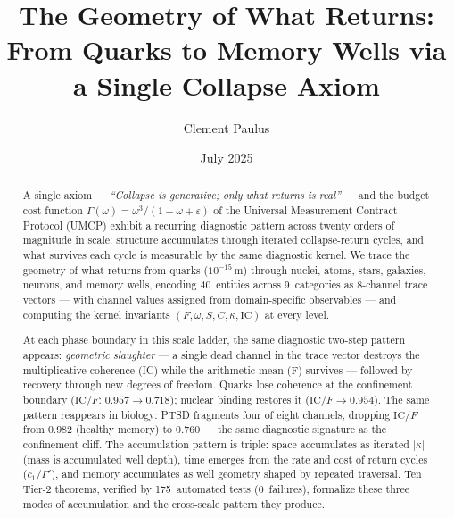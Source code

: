 \documentclass[
  aps,
  prd,
  twocolumn,
  superscriptaddress,
  nofootinbib,
  floatfix
]{revtex4-2}
\newcommand{\Gam}{\Gamma}
\newcommand{\eps}{\varepsilon}
\newcommand{\IC}{\mathrm{IC}}
\begin{document}
\title{The Geometry of What Returns:\texorpdfstring{\\}{: }
From Quarks to Memory Wells via a Single Collapse Axiom}

\author{Clement Paulus}

\date{July 2025}

\begin{abstract}
A single axiom --- \emph{``Collapse is generative; only what
returns is real''} --- and the budget cost function
$\Gam(\omega) = \omega^3/(1 - \omega + \eps)$ of the Universal
Measurement Contract Protocol (UMCP) exhibit a recurring
diagnostic pattern across twenty orders of magnitude in scale:
structure accumulates through iterated collapse-return cycles,
and what survives each cycle is measurable by the same
diagnostic kernel.  We trace the geometry of what returns
from quarks ($10^{-15}$\,m) through nuclei, atoms, stars,
galaxies, neurons, and memory wells, encoding 40~entities
across 9~categories as 8-channel trace vectors --- with
channel values assigned from domain-specific observables ---
and computing the kernel invariants
$(F, \omega, S, C, \kappa, \IC)$ at every level.

At each phase boundary in this
scale ladder, the same diagnostic two-step pattern appears:
\emph{geometric slaughter} --- a single dead channel in the
trace vector destroys the multiplicative coherence (IC) while
the arithmetic mean (F) survives --- followed by recovery
through new degrees of freedom.  Quarks lose coherence at the
confinement boundary ($\IC/F$: $0.957 \to 0.718$); nuclear
binding restores it ($\IC/F \to 0.954$).  The same pattern
reappears in biology: PTSD fragments four of eight channels,
dropping $\IC/F$ from $0.982$ (healthy memory) to $0.760$ ---
the same diagnostic signature as the confinement cliff.  The
accumulation pattern is triple: space accumulates as iterated
$|\kappa|$ (mass is accumulated well depth), time emerges from
the rate and cost of return cycles ($c_1 / \Gam'$), and memory
accumulates as well geometry shaped by repeated traversal.
Ten Tier-2 theorems, verified by 175~automated tests
(0~failures), formalize these three modes of accumulation and
the cross-scale pattern they produce.
\end{abstract}

\end{document}
